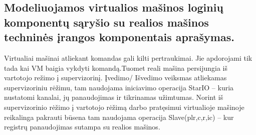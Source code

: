 \documentclass[oneside]{VUMIFPSkursinis}
\begin{document}
	\subsection{Modeliuojamos virtualios mašinos loginių komponentų sąryšio su realios mašinos techninės įrangos komponentais aprašymas.}
	Virtualiai mašinai atliekant komandas gali kilti pertraukimai. Jie apdorojami tik tada kai VM
baigia vykdyti komandą.Tuomet reali mašina persijungia iš vartotojo režimo į supervizorinį.\newline
Įvedimo/ Išvedimo veiksmas atliekamas supervizoriniu rėžimu, tam naudojama iniciavimo
operacija StarIO – kuria nustatomi kanalai, jų panaudojimas ir tikrinamas užimtumas.\newline
Norint iš supervizorinio rėžimo į vartotojo rėžimą darbo pratęsimui virtualioje mašinoje
reikalinga pakrauti būsena tam naudojama operacija Slave(plr,c,r,ic) – kur registrų panaudojimas
sutampa su realios mašinos.
	
\end{document}
